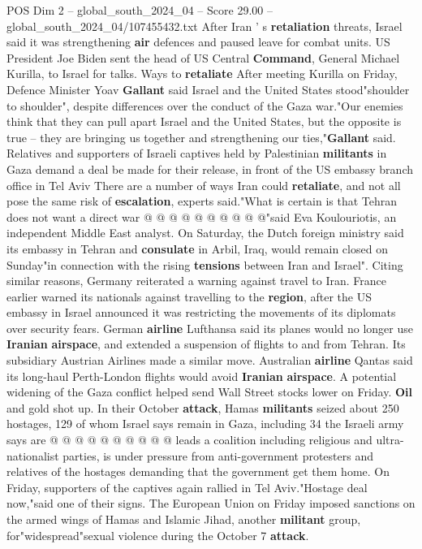 \begin{textsample}{POS Dim 2 – global\_south\_2024\_04 – Score 29.00 – global\_south\_2024\_04/107455432.txt}
After Iran ' s \textbf{retaliation} threats, Israel said it was strengthening \textbf{air} defences and paused leave for combat units.
US President Joe Biden sent the head of US Central \textbf{Command}, General Michael Kurilla, to Israel for talks.
Ways to \textbf{retaliate} After meeting Kurilla on Friday, Defence Minister Yoav \textbf{Gallant} said Israel and the United States stood"shoulder to shoulder", despite differences over the conduct of the Gaza war."Our enemies think that they can pull apart Israel and the United States, but the opposite is true -- they are bringing us together and strengthening our ties,"\textbf{Gallant} said.
Relatives and supporters of Israeli captives held by Palestinian \textbf{militants} in Gaza demand a deal be made for their release, in front of the US embassy branch office in Tel Aviv There are a number of ways Iran could \textbf{retaliate}, and not all pose the same risk of \textbf{escalation}, experts said."What is certain is that Tehran does not want a direct war @ @ @ @ @ @ @ @ @ @"said Eva Koulouriotis, an independent Middle East analyst.
On Saturday, the Dutch foreign ministry said its embassy in Tehran and \textbf{consulate} in Arbil, Iraq, would remain closed on Sunday"in connection with the rising \textbf{tensions} between Iran and Israel".
Citing similar reasons, Germany reiterated a warning against travel to Iran.
France earlier warned its nationals against travelling to the \textbf{region}, after the US embassy in Israel announced it was restricting the movements of its diplomats over security fears.
German \textbf{airline} Lufthansa said its planes would no longer use \textbf{Iranian} \textbf{airspace}, and extended a suspension of flights to and from Tehran.
Its subsidiary Austrian Airlines made a similar move.
Australian \textbf{airline} Qantas said its long-haul Perth-London flights would avoid \textbf{Iranian} \textbf{airspace}.
A potential widening of the Gaza conflict helped send Wall Street stocks lower on Friday. \textbf{Oil} and gold shot up.
In their October \textbf{attack}, Hamas \textbf{militants} seized about 250 hostages, 129 of whom Israel says remain in Gaza, including 34 the Israeli army says are @ @ @ @ @ @ @ @ @ @ leads a coalition including religious and ultra-nationalist parties, is under pressure from anti-government protesters and relatives of the hostages demanding that the government get them home.
On Friday, supporters of the captives again rallied in Tel Aviv."Hostage deal now,"said one of their signs.
The European Union on Friday imposed sanctions on the armed wings of Hamas and Islamic Jihad, another \textbf{militant} group, for"widespread"sexual violence during the October 7 \textbf{attack}.

\end{textsample}
